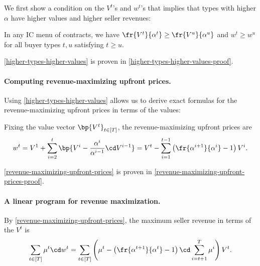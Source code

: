 

We first show a condition on the $V^t$'s and $w^t$'s that implies that types with higher $\alpha$ have higher values and higher seller revenues:
\begin{lemma} \label{higher-types-higher-values}
    In any IC menu of contracts, we have $\fr{V^t}{\alpha^t} \geq \fr{V^u}{\alpha^u}$ and $w^t \geq w^u$ for all buyer types $t,u$ satisfying $t \ge u$.
\end{lemma}

\cref{higher-types-higher-values} is proven in \cref{higher-types-higher-values-proof}.

\paragraph{Computing revenue-maximizing upfront prices.}

Using \cref{higher-types-higher-values} allows us to derive exact formulas for the revenue-maximizing upfront prices in terms of the values:

\begin{lemma} \label{revenue-maximizing-upfront-prices}
Fixing the value vector $\bp{V^t}_{t\in [T]}$, the revenue-maximizing upfront prices are
\begin{align*}
w^t = V^1 + \sum_{i=2}^t \bp{V^i - \frac{\alpha^i}{\alpha^{i-1}}\cd V^{i-1}} = V^t  - \sum_{i=1}^{t-1} \left( \fr{\alpha^{i+1}}{\alpha^i} - 1\right) V^i.
\end{align*}
\end{lemma}

\cref{revenue-maximizing-upfront-prices} is proven in \cref{revenue-maximizing-upfront-prices-proof}.

\paragraph{A linear program for revenue maximization.}

By \cref{revenue-maximizing-upfront-prices}, the maximum seller revenue in terms of the $V^t$ is
\begin{align}
\sum_{t\in [T]} \mu^t \cd w^t = \sum_{t\in [T]} \left(\mu^t -  \left(\fr{\alpha^{t+1}}{\alpha^t} - 1\right) \cd \sum_{i=t+1}^T  \mu^i  \right) V^t.
\end{align}

